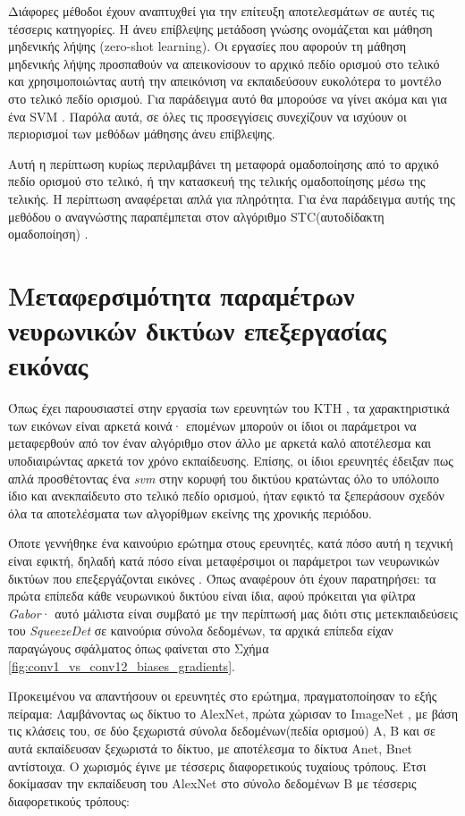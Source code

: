 Διάφορες μέθοδοι έχουν αναπτυχθεί για την επίτευξη αποτελεσμάτων σε αυτές τις τέσσερις κατηγορίες. Η άνευ επίβλεψης μετάδοση γνώσης ονομάζεται και μάθηση μηδενικής λήψης (zero-shot learning). Οι εργασίες που αφορούν τη μάθηση μηδενικής λήψης προσπαθούν να απεικονίσουν το αρχικό πεδίο ορισμού στο τελικό και χρησιμοποιώντας αυτή την απεικόνιση να εκπαιδεύσουν ευκολότερα το μοντέλο στο τελικό πεδίο ορισμού. Για παράδειγμα αυτό θα μπορούσε να γίνει ακόμα και για ένα SVM \cite{45}. Παρόλα αυτά, σε όλες τις προσεγγίσεις συνεχίζουν να ισχύουν οι περιορισμοί των μεθόδων μάθησης άνευ επίβλεψης.

Αυτή η περίπτωση κυρίως περιλαμβάνει τη μεταφορά ομαδοποίησης από το αρχικό πεδίο ορισμού στο τελικό, ή την κατασκευή της τελικής ομαδοποίησης μέσω της τελικής. Η περίπτωση αναφέρεται απλά για πληρότητα. Για ένα παράδειγμα αυτής της μεθόδου ο αναγνώστης παραπέμπεται στον αλγόριθμο STC(αυτοδίδακτη ομαδοποίηση) \cite{53}.

\section{Μεταφερσιμότητα παραμέτρων νευρωνικών δικτύων επεξεργασίας εικόνας \cite{55}}
\label{section:transferability}
Όπως έχει παρουσιαστεί στην εργασία των ερευνητών του KTH \cite{56}, τα χαρακτηριστικά των εικόνων είναι αρκετά κοινά· επομένων μπορούν οι ίδιοι οι παράμετροι να μεταφερθούν από τον έναν αλγόριθμο στον άλλο με αρκετά καλό αποτέλεσμα και υποδιαιρώντας αρκετά τον χρόνο εκπαίδευσης. Επίσης, οι ίδιοι ερευνητές έδειξαν πως απλά προσθέτοντας ένα \textit{svm} στην κορυφή του δικτύου κρατώντας όλο το υπόλοιπο ίδιο και ανεκπαίδευτο στο τελικό πεδίο ορισμού, ήταν εφικτό τα ξεπεράσουν σχεδόν όλα τα αποτελέσματα των αλγορίθμων εκείνης της χρονικής περιόδου.

Όποτε γεννήθηκε ένα καινούριο ερώτημα στους ερευνητές, κατά πόσο αυτή η τεχνική είναι εφικτή, δηλαδή κατά πόσο είναι μεταφέρσιμοι οι παράμετροι των νευρωνικών δικτύων που επεξεργάζονται εικόνες \cite{55}. Όπως αναφέρουν ότι έχουν παρατηρήσει: τα πρώτα επίπεδα κάθε νευρωνικού δικτύου είναι ίδια, αφού πρόκειται για φίλτρα \textit{Gabor}· αυτό μάλιστα είναι συμβατό με την περίπτωσή μας διότι στις μετεκπαιδεύσεις του \textit{SqueezeDet} σε καινούρια σύνολα δεδομένων, τα αρχικά επίπεδα είχαν παραγώγους σφάλματος όπως φαίνεται στο Σχήμα \ref{fig:conv1_vs_conv12_biases_gradients}.

Προκειμένου να απαντήσουν οι ερευνητές στο ερώτημα, πραγματοποίησαν το εξής πείραμα: Λαμβάνοντας ως δίκτυο το AlexNet, πρώτα χώρισαν το ImageNet \cite{56}, με βάση τις κλάσεις του, σε δύο ξεχωριστά σύνολα δεδομένων(πεδία ορισμού) A, B και σε αυτά εκπαίδευσαν ξεχωριστά το δίκτυο, με αποτέλεσμα το δίκτυα Anet, Bnet αντίστοιχα. Ο χωρισμός έγινε με τέσσερις διαφορετικούς τυχαίους τρόπους. Έτσι δοκίμασαν την εκπαίδευση του AlexNet στο σύνολο δεδομένων B με τέσσερις διαφορετικούς τρόπους:

